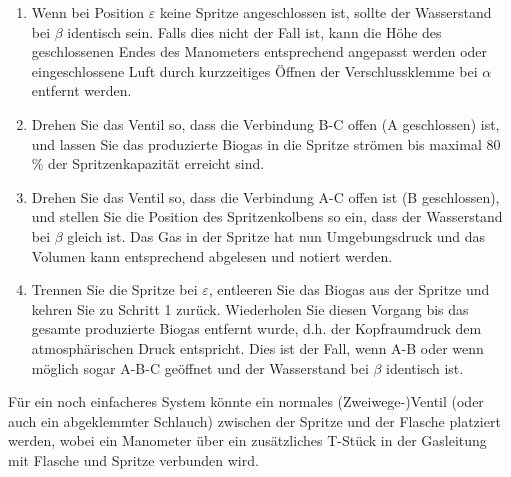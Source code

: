 \documentclass[]{article}
\begin{document}
\begin{enumerate}
  \item Wenn bei Position $\varepsilon$ keine Spritze angeschlossen ist, sollte der Wasserstand bei $\beta$ identisch sein. Falls dies nicht der Fall ist, kann die Höhe des geschlossenen Endes des Manometers entsprechend angepasst werden oder eingeschlossene Luft durch kurzzeitiges Öffnen der Verschlussklemme bei $\alpha$ entfernt werden.
  \item Drehen Sie das Ventil so, dass die Verbindung B-C offen (A geschlossen) ist, und lassen Sie das produzierte Biogas in die Spritze strömen bis maximal 80 \% der Spritzenkapazität erreicht sind.
  \item Drehen Sie das Ventil so, dass die Verbindung A-C offen ist (B geschlossen), und stellen Sie die Position des Spritzenkolbens so ein, dass der Wasserstand bei $\beta$ gleich ist. Das Gas in der Spritze hat nun Umgebungsdruck und das Volumen kann entsprechend abgelesen und notiert werden.
  \item Trennen Sie die Spritze bei $\varepsilon$, entleeren Sie das Biogas aus der Spritze und kehren Sie zu Schritt 1 zurück. Wiederholen Sie diesen Vorgang bis das gesamte produzierte Biogas entfernt wurde, d.h. der Kopfraumdruck dem atmosphärischen Druck entspricht. Dies ist der Fall, wenn A-B oder wenn möglich sogar A-B-C geöffnet und der Wasserstand bei $\beta$ identisch ist.
\end{enumerate}

Für ein noch einfacheres System könnte ein normales (Zweiwege-)Ventil (oder auch ein abgeklemmter Schlauch) zwischen der Spritze und der Flasche platziert werden, wobei ein Manometer über ein zusätzliches T-Stück in der Gasleitung mit Flasche und Spritze verbunden wird.
\end{document}

